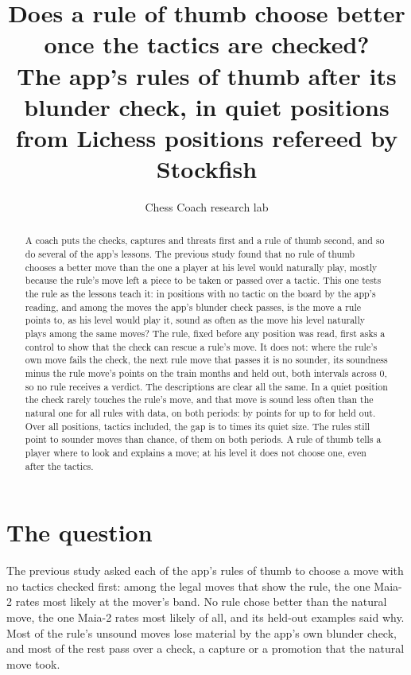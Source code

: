 \documentclass[11pt]{article}
\title{Does a rule of thumb choose better once the tactics are checked?\\[0.3em]
\large The app's rules of thumb after its blunder check, in quiet positions from \Inherited{}
Lichess positions refereed by Stockfish}
\author{Chess Coach research lab}
\date{}
\begin{document}
\maketitle

\begin{abstract}
A coach puts the checks, captures and threats first and a rule of thumb second, and so do several of
the app's lessons. The previous study found that no rule of thumb chooses a better move than the one
a player at his level would naturally play, mostly because the rule's move left a piece to be taken
or passed over a tactic. This one tests the rule as the lessons teach it: in positions with no tactic
on the board by the app's reading, and among the moves the app's blunder check passes, is the move a
rule points to, as his level would play it, sound as often as the move his level naturally plays
among the same moves? The rule, fixed before any position was read, first asks a control to show
that the check can rescue a rule's move. It does not: where the rule's own move fails the check, the
next rule move that passes it is no sounder, its soundness minus the rule move's \ControlTrain{}
points on the train months and \ControlHeld{} held out, both intervals across 0, so no rule receives
a verdict. The descriptions
are clear all the same. In a quiet position the check rarely touches the rule's move, and that move
is sound less often than the natural one for all \NWith{} rules with data, on both periods: by
\LiftLow{} points for \LiftLowName{} up to \LiftHigh{} for \LiftHighName{} held out. Over all
positions, tactics included, the gap is \RatioLow{} to \RatioHigh{} times its quiet size. The rules
still point to sounder moves than chance, \NContent{} of them on both periods. A rule of thumb tells
a player where to look and explains a move; at his level it does not choose one, even after the
tactics.
\end{abstract}

\section{The question}

The previous study asked each of the app's rules of thumb to choose a move with no tactics checked
first: among the legal moves that show the rule, the one Maia-2 rates most likely at the mover's
band. No rule chose better than the natural move, the one Maia-2 rates most likely of all, and its
held-out examples said why. Most of the rule's unsound moves lose material by the app's own blunder
check, and most of the rest pass over a check, a capture or a promotion that the natural move took.
\end{document}
